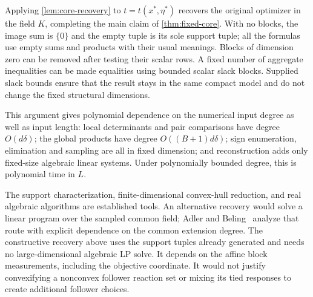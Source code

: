 Applying \cref{lem:core-recovery} to
$t=t(x^*,\eta^*)$ recovers the original optimizer in the field $K$,
completing the main claim of \cref{thm:fixed-core}. With no blocks,
the image sum is $\{0\}$ and the empty tuple is its sole support tuple;
all the formulas use empty sums and products with their usual meanings.
Blocks of dimension zero can be removed after testing their scalar rows.
A fixed number of aggregate inequalities can be made equalities using
bounded scalar slack blocks. Supplied slack bounds ensure that the
result stays in the same compact model and do not change the fixed
structural dimensions.

This argument gives polynomial dependence on the numerical input degree
as well as input length: local determinants and pair comparisons have
degree $O(d\delta)$; the global products have degree
$O((B+1)d\delta)$; sign enumeration, elimination and sampling are all
in fixed dimension; and reconstruction adds only fixed-size algebraic
linear systems. Under polynomially bounded degree, this is polynomial
time in $L$.

The support characterization, finite-dimensional convex-hull reduction,
and real algebraic algorithms are established tools. An alternative
recovery would solve a linear program over the sampled common field;
Adler and Beling~\cite{AdlerBeling1994} analyze that route with explicit
dependence on the common extension degree. The constructive recovery
above uses the support tuples already generated and needs no
large-dimensional algebraic LP solve. It depends on the affine block
measurements, including the objective coordinate. It would not justify
convexifying a nonconvex follower reaction set or mixing its tied
responses to create additional follower choices.
